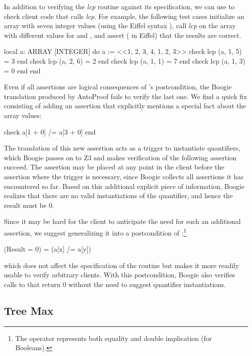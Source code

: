 In addition to verifying the \emph{lcp} routine against its specification, we can use \AutoProof to check client code that calls \emph{lcp}.
For example, the following test cases initialize an array with seven integer values (using the Eiffel syntax ), call \emph{lcp} on the array with different values for  and , and assert ( in Eiffel) that the results are correct.

\begin{erunning}
local
  a: ARRAY [INTEGER]
do
  a := <<1, 2, 3, 4, 1, 2, 3>>
  check lcp (a, 1, 5) = 3 end
  check lcp (a, 2, 6) = 2 end
  check lcp (a, 1, 1) = 7 end
  check lcp (a, 1, 3) = 0 end
end
\end{erunning}

Even if all assertions are logical consequences of 's postcondition, the Boogie translation produced by AutoProof fails to verify the last one.
We find a quick fix consisting of adding an assertion that explicitly mentions a special fact about the array values:
\begin{erunning}
check a[1 + 0] /= a[3 + 0] end
\end{erunning}
The translation of this new assertion acts as a trigger to instantiate quantifiers, which Boogie passes on to Z3 and makes verification of the following assertion succeed.
The assertion  may be placed at any point in the client before the assertion where the trigger is necessary, since Boogie collects all assertions it has encountered so far.
Based on this additional explicit piece of information, Boogie realizes that there are no valid instantiations of the quantifier, and hence the result must be $0$.

Since it may be hard for the client to anticipate the need for such an additional assertion, we suggest generalizing it into a postcondition of :\footnote{The operator \e{=} represents both equality and double implication (for Booleans).}
\begin{erunning}
(Result = 0) = (a[x] /= a[y])
\end{erunning}
which does not affect the specification of the routine but makes it more readily usable to verify arbitrary clients.
With this postcondition, Boogie also verifies calls to  that return $0$ without the need to suggest quantifier instantiations.


\subsection{Tree Max} \label{sec:eval-challenges:tree-max}

